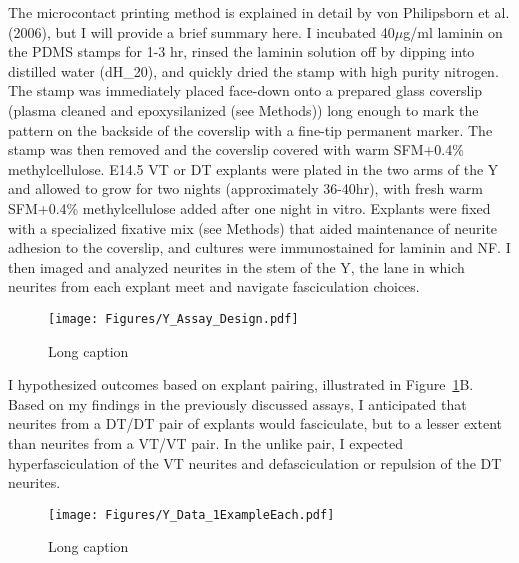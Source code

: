 The microcontact printing method is explained in detail by von Philipsborn et al. (2006), but I will provide a brief summary here.
I incubated 40$\mu$g/ml laminin on the PDMS stamps for 1-3 hr, rinsed the laminin solution off by dipping into distilled water (dH_20), and quickly dried the stamp with high purity nitrogen.
The stamp was immediately placed face-down onto a prepared glass coverslip (plasma cleaned and epoxysilanized (see Methods)) long enough to mark the pattern on the backside of the coverslip with a fine-tip permanent marker.
The stamp was then removed and the coverslip covered with warm SFM+0.4\% methylcellulose.
E14.5 VT or DT explants were plated in the two arms of the Y and allowed to grow for two nights (approximately 36-40hr), with fresh warm SFM+0.4\% methylcellulose added after one night in vitro.
Explants were fixed with a specialized fixative mix (see Methods) that aided maintenance of neurite adhesion to the coverslip, and cultures were immunostained for laminin and NF.
I then imaged and analyzed neurites in the stem of the Y, the lane in which neurites from each explant meet and navigate fasciculation choices.
\begin{figure}[hbtp]
    \begin{center}
        \texttt{[image: Figures/Y\_Assay\_Design.pdf]}
        \caption[Short caption]
        {Long caption}
        \label{Figures/Y_Assay_Design}
    \end{center}
\end{figure}
I hypothesized outcomes based on explant pairing, illustrated in Figure~\ref{Figures/Y_Assay_Design}B.
Based on my findings in the previously discussed assays, I anticipated that neurites from a DT/DT pair of explants would fasciculate, but to a lesser extent than neurites from a VT/VT pair.
In the unlike pair, I expected hyperfasciculation of the VT neurites and defasciculation or repulsion of the DT neurites.



\begin{figure}[hbtp]
    \begin{center}
        \texttt{[image: Figures/Y\_Data\_1ExampleEach.pdf]}
        \caption[Short caption]
        {Long caption}
        \label{Figures/Y_Data_1ExampleEach}
    \end{center}
\end{figure}